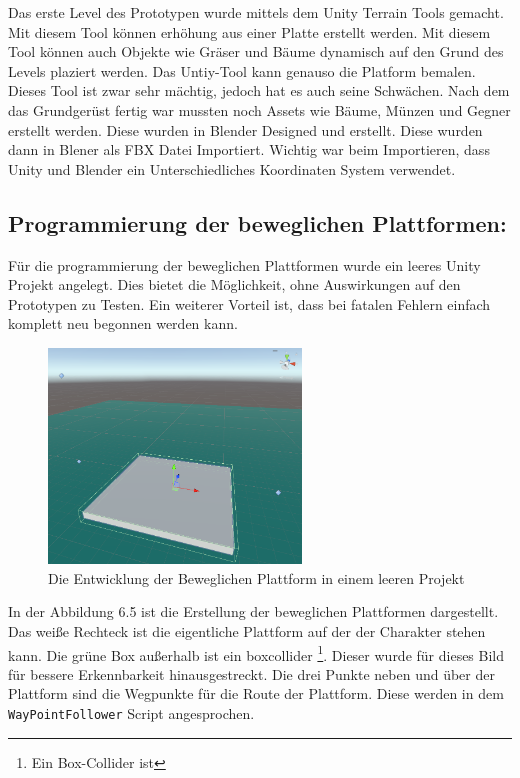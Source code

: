 Das erste Level des Prototypen wurde mittels dem Unity Terrain Tools gemacht. Mit diesem Tool können erhöhung aus einer Platte erstellt werden. Mit diesem Tool können auch Objekte wie Gräser und Bäume dynamisch auf den Grund des Levels plaziert werden. Das Untiy-Tool kann genauso die Platform bemalen. Dieses Tool ist zwar sehr mächtig, jedoch hat es auch seine Schwächen. Nach dem das Grundgerüst fertig war mussten noch Assets wie Bäume, Münzen und Gegner erstellt werden. Diese wurden in Blender Designed und erstellt. Diese wurden dann in Blener als FBX Datei Importiert. Wichtig war beim Importieren, dass Unity und Blender ein Unterschiedliches Koordinaten System verwendet. 




\pagebreak

\subsection{Programmierung der beweglichen Plattformen:}

Für die programmierung der beweglichen Plattformen wurde ein leeres Unity Projekt angelegt. Dies bietet die Möglichkeit, ohne Auswirkungen auf den Prototypen zu Testen. Ein weiterer Vorteil ist, dass bei fatalen Fehlern einfach komplett neu begonnen werden kann. 

\begin{figure}[h]
  \centering
  \includegraphics*[width=0.6\textwidth]{chapters/04/images/V1/MovingPlatformV1.png}
  \caption{Die Entwicklung der Beweglichen Plattform in einem leeren Projekt}
  \label{fig:PE04}
\end{figure}

In der Abbildung 6.5 ist die Erstellung der beweglichen Plattformen dargestellt. Das weiße Rechteck ist die eigentliche Plattform auf der der Charakter stehen kann. Die grüne Box außerhalb ist ein \gls{boxcollider} \footnote[1]{Ein Box-Collider ist}. Dieser wurde für dieses Bild für bessere Erkennbarkeit hinausgestreckt. Die drei Punkte neben und über der Plattform sind die Wegpunkte für die Route der Plattform. Diese werden in dem \verb+WayPointFollower+ Script angesprochen. \\

